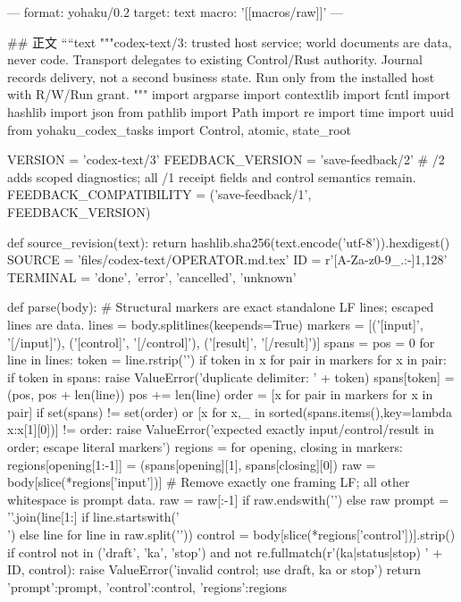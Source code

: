 ---
format: yohaku/0.2
target: text
macro: '[[macros/raw]]'
---

## 正文
````text
"""codex-text/3: trusted host service; world documents are data, never code.
Transport delegates to existing Control/Rust authority. Journal records delivery,
not a second business state. Run only from the installed host with R/W/Run grant.
"""
import argparse
import contextlib
import fcntl
import hashlib
import json
from pathlib import Path
import re
import time
import uuid
from yohaku_codex_tasks import Control, atomic, state_root

VERSION = 'codex-text/3'
FEEDBACK_VERSION = 'save-feedback/2'
# /2 adds scoped diagnostics; all /1 receipt fields and control semantics remain.
FEEDBACK_COMPATIBILITY = ('save-feedback/1', FEEDBACK_VERSION)

def source_revision(text):
    return hashlib.sha256(text.encode('utf-8')).hexdigest()
SOURCE = 'files/codex-text/OPERATOR.md.tex'
ID = r'[A-Za-z0-9_.:-]{1,128}'
TERMINAL = {'done', 'error', 'cancelled', 'unknown'}

def parse(body):
    # Structural markers are exact standalone LF lines; escaped lines are data.
    lines = body.splitlines(keepends=True)
    markers = [('[input]', '[/input]'), ('[control]', '[/control]'), ('[result]', '[/result]')]
    spans = {}
    pos = 0
    for line in lines:
        token = line.rstrip('\n')
        if token in {x for pair in markers for x in pair}:
            if token in spans: raise ValueError('duplicate delimiter: ' + token)
            spans[token] = (pos, pos + len(line))
        pos += len(line)
    order = [x for pair in markers for x in pair]
    if set(spans) != set(order) or [x for x,_ in sorted(spans.items(),key=lambda x:x[1][0])] != order:
        raise ValueError('expected exactly input/control/result in order; escape literal markers')
    regions = {}
    for opening, closing in markers:
        regions[opening[1:-1]] = (spans[opening][1], spans[closing][0])
    raw = body[slice(*regions['input'])]
    # Remove exactly one framing LF; all other whitespace is prompt data.
    raw = raw[:-1] if raw.endswith('\n') else raw
    prompt = '\n'.join(line[1:] if line.startswith('\\') else line for line in raw.split('\n'))
    control = body[slice(*regions['control'])].strip()
    if control not in ('draft', 'ka', 'stop') and not re.fullmatch(r'(ka|status|stop) ' + ID, control):
        raise ValueError('invalid control; use draft, ka or stop')
    return {'prompt':prompt, 'control':control, 'regions':regions}


